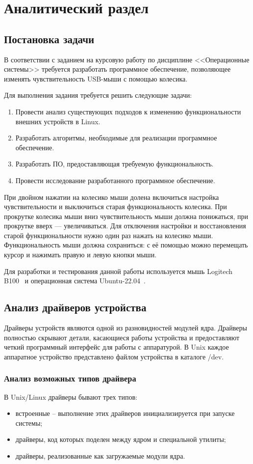 \chapter{Аналитический раздел}

\section{Постановка задачи}
В соответствии с заданием на курсовую работу по дисциплине <<Операционные системы>> требуется разработать программное обеспечение, позволяющее изменять чувствительность USB-мыши с помощью колесика.

Для выполнения задания требуется решить следующие задачи:
\begin{enumerate}
	\item Провести анализ существующих подходов к изменению функциональности внешних устройств в Linux.
	\item Разработать алгоритмы, необходимые для реализации программное обеспечение.
	\item Разработать ПО, предоставляющая требуемую функциональность.
	\item Провести исследование разработанного программное обеспечение.
\end{enumerate}

При двойном нажатии на колесико мыши долена включиться настройка чувствительности и выключиться старая функциональность колесика. При прокрутке колесика мыши вниз чувствительность мыши должна понижаться, при прокрутке вверх --- увеличиваться. Для отключения настройки и восстановления старой функциональности нужно один раз нажать на колесико мыши.
Функциональность мыши должна сохраниться: с её помощью можно перемещать курсор и нажимать правую и левую кнопки мыши.

Для разработки и тестирования данной работы используется мышь Logitech B100~\cite{mouse} и операционная система Ubuntu-22.04~\cite{ubuntu}.

\section{Анализ драйверов устройства}
Драйверы устройств являются одной из разновидностей модулей ядра.
Драйверы полностью скрывают детали, касающиеся работы устройства и предоставляют четкий программный интерфейс для работы с аппаратурой. 
В Unix каждое аппаратное устройство представлено файлом устройства в каталоге /dev. 

\subsection{Анализ возможных типов драйвера}
В Unix/Linux драйверы бывают трех типов:
\begin{itemize}[label=---]
	\item встроенные -- выполнение этих драйверов инициализируется при запуске системы;
	\item драйверы, код которых поделен между ядром и специальной утилиты;
	\item драйверы, реализованные как загружаемые модули ядра.
\end{itemize}

